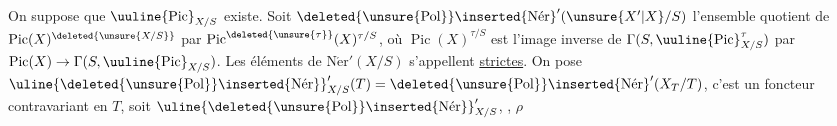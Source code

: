 On suppose que $\uuline{\operatorname{Pic}}_{X/S}$ existe. Soit $\deleted{\unsure{\operatorname{Pol}}}\inserted{\operatorname{N\acute{e}r}}'(\unsure{X'|X}/S)$ l'ensemble quotient de $\operatorname{Pic}(X)^{\deleted{\unsure{X/S}}}$  par $\operatorname{Pic}^{\deleted{\unsure{\tau}}}(X)^{\tau/S}$, où $\operatorname{Pic}(X)^{\tau/S}$ est l'image inverse de $\Gamma(S,\uuline{\operatorname{Pic}}^{\tau}_{X/S})$ par $\operatorname{Pic}(X)\to\Gamma(S,\uuline{\operatorname{Pic}}_{X/S})$. Les éléments de $\operatorname{N\acute{e}r}'(X/S)$ s'appellent  \uline{strictes}. On pose $\uline{\deleted{\unsure{\operatorname{Pol}}}\inserted{\operatorname{N\acute{e}r}}}'_{X/S}(T)=\deleted{\unsure{\operatorname{Pol}}}\inserted{\operatorname{N\acute{e}r}}'(X_T/T)$, c'est un foncteur contravariant en $T$, soit $\uline{\deleted{\unsure{\operatorname{Pol}}}\inserted{\operatorname{N\acute{e}r}}}'_{X/S}$,     , $\rho$

